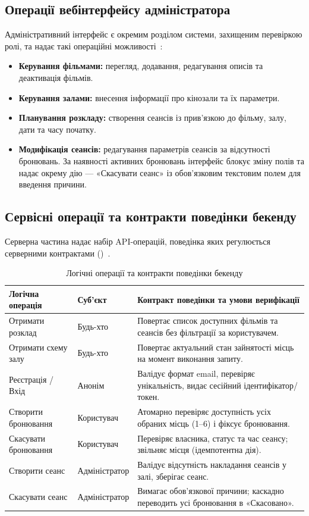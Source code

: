 \subsection{Операції вебінтерфейсу адміністратора}\label{sec:interfeisy-admin}
Адміністративний інтерфейс є окремим розділом системи, захищеним перевіркою ролі, та надає такі операційні можливості~:
\begin{itemize}
    \item \textbf{Керування фільмами:} перегляд, додавання, редагування описів та деактивація фільмів.
    \item \textbf{Керування залами:} внесення інформації про кінозали та їх параметри.
    \item \textbf{Планування розкладу:} створення сеансів із прив'язкою до фільму, залу, дати та часу початку.
    \item \textbf{Модифікація сеансів:} редагування параметрів сеансів за відсутності бронювань. За наявності активних бронювань інтерфейс блокує зміну полів та надає окрему дію --- «Скасувати сеанс» із обов'язковим текстовим полем для введення причини.
\end{itemize}

\subsection{Сервісні операції та контракти поведінки бекенду}\label{sec:interfeisy-backend}
Серверна частина надає набір API-операцій, поведінка яких регулюється серверними контрактами ()~.

\begin{table}[htbp]
\caption{Логічні операції та контракти поведінки бекенду}\label{tab:backend-operations}
\centering
\begin{tabularx}{\textwidth}{@{}l l L@{}}
\toprule
\textbf{Логічна операція} & \textbf{Суб'єкт} & \textbf{Контракт поведінки та умови верифікації} \\
\midrule
Отримати розклад & Будь-хто & Повертає список доступних фільмів та сеансів без фільтрації за користувачем. \\
Отримати схему залу & Будь-хто & Повертає актуальний стан зайнятості місць на момент виконання запиту. \\
Реєстрація / Вхід & Анонім & Валідує формат email, перевіряє унікальність, видає сесійний ідентифікатор/токен. \\
Створити бронювання & Користувач & Атомарно перевіряє доступність усіх обраних місць (1--6) і фіксує бронювання. \\
Скасувати бронювання & Користувач & Перевіряє власника, статус та час сеансу; звільняє місця (ідемпотентна дія). \\
Створити сеанс & Адміністратор & Валідує відсутність накладання сеансів у залі, зберігає сеанс. \\
Скасувати сеанс & Адміністратор & Вимагає обов'язкової причини; каскадно переводить усі бронювання в «Скасовано». \\
\bottomrule
\end{tabularx}
\end{table}

